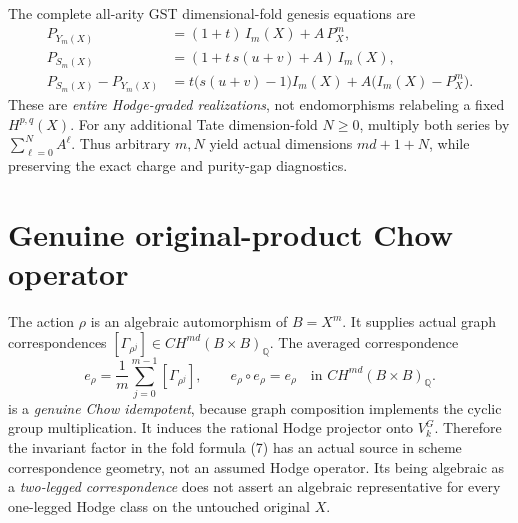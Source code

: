 \documentclass[11pt]{article}
\begin{document}
The complete all-arity GST dimensional-fold genesis equations are
\[
 \boxed{\begin{aligned}
 P_{Y_m(X)}&=(1+t)\,I_m(X)+A\,P_X^m,\\
 P_{S_m(X)}&=(1+t\,s(u+v)+A)\,I_m(X),\\
 P_{S_m(X)}-P_{Y_m(X)}
     &=t\bigl(s(u+v)-1\bigr)I_m(X)
       +A\bigl(I_m(X)-P_X^m\bigr).
 \end{aligned}}                                       \tag{7}
\]
These are \emph{entire Hodge-graded realizations}, not
endomorphisms relabeling a fixed $H^{p,q}(X)$.
For any additional Tate dimension-fold $N\geq0$, multiply
both series by $\sum_{\ell=0}^N A^\ell$.
Thus arbitrary $m,N$ yield actual dimensions $md+1+N$,
while preserving the exact charge and purity-gap diagnostics.

\section{Genuine original-product Chow operator}
The action $\rho$ is an algebraic automorphism of
$B=X^m$. It supplies actual graph correspondences
$[\Gamma_{\rho^j}]\in CH^{md}(B\times B)_{\mathbb Q}$.
The averaged correspondence
\[
 \boxed{\qquad
 e_\rho=\frac1m\sum_{j=0}^{m-1}[\Gamma_{\rho^j}],
 \qquad e_\rho\circ e_\rho=e_\rho
 \quad\text{in } CH^{md}(B\times B)_{\mathbb Q}.
 \qquad}                                               \tag{8}
\]
is a \emph{genuine Chow idempotent}, because graph composition
implements the cyclic group multiplication. It induces the
rational Hodge projector onto $V_k^G$. Therefore the invariant
factor in the fold formula (7) has an actual source in scheme
correspondence geometry, not an assumed Hodge operator.
Its being algebraic as a \emph{two-legged correspondence}
does not assert an algebraic representative for every
one-legged Hodge class on the untouched original $X$.
\end{document}
